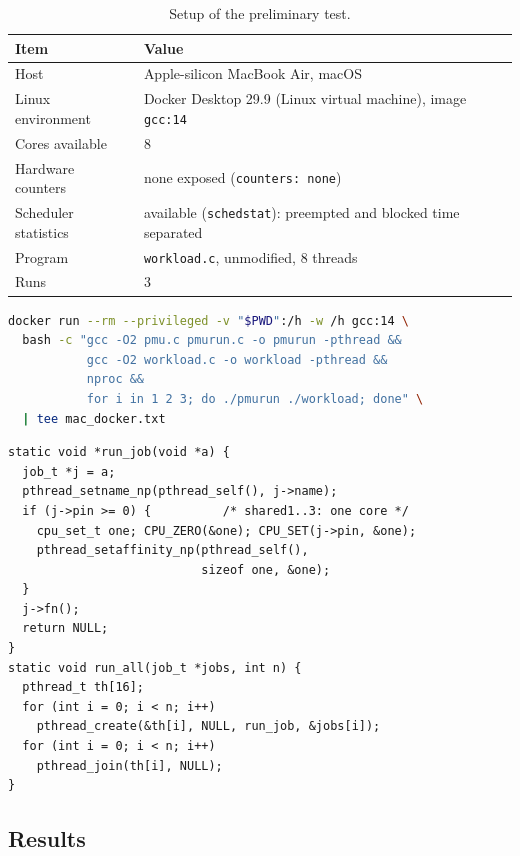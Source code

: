 \documentclass[10pt,a4paper,twocolumn]{article}
\newcommand{\code}[1]{\texttt{\small #1}}
\begin{document}
\begin{table}[t]
\centering\footnotesize
\caption{Setup of the preliminary test.}
\label{tab:setup}
\begin{tabularx}{\columnwidth}{|>{\raggedright\arraybackslash}p{2.0cm}|L|}
\hline
\textbf{Item} & \textbf{Value} \\ \hline
Host & Apple-silicon MacBook Air, macOS \\ \hline
Linux environment & Docker Desktop 29.9 (Linux virtual machine), image \code{gcc:14} \\ \hline
Cores available & 8 \\ \hline
Hardware counters & none exposed (\code{counters: none}) \\ \hline
Scheduler statistics & available (\code{schedstat}): preempted and blocked time separated \\ \hline
Program & \code{workload.c}, unmodified, 8 threads \\ \hline
Runs & 3 \\ \hline
\end{tabularx}
\end{table}

\begin{lstlisting}[language=bash,caption={Commands used for the test (run in the folder containing the source).},label={lst:cmd}]
docker run --rm --privileged -v "$PWD":/h -w /h gcc:14 \
  bash -c "gcc -O2 pmu.c pmurun.c -o pmurun -pthread &&
           gcc -O2 workload.c -o workload -pthread &&
           nproc &&
           for i in 1 2 3; do ./pmurun ./workload; done" \
  | tee mac_docker.txt
\end{lstlisting}

\begin{lstlisting}[caption={How the validation program starts its threads on Linux (\code{workload.c}); no harness call is involved.},label={lst:start}]
static void *run_job(void *a) {
  job_t *j = a;
  pthread_setname_np(pthread_self(), j->name);
  if (j->pin >= 0) {          /* shared1..3: one core */
    cpu_set_t one; CPU_ZERO(&one); CPU_SET(j->pin, &one);
    pthread_setaffinity_np(pthread_self(),
                           sizeof one, &one);
  }
  j->fn();
  return NULL;
}
static void run_all(job_t *jobs, int n) {
  pthread_t th[16];
  for (int i = 0; i < n; i++)
    pthread_create(&th[i], NULL, run_job, &jobs[i]);
  for (int i = 0; i < n; i++)
    pthread_join(th[i], NULL);
}
\end{lstlisting}

\subsection{Results}
\end{document}

